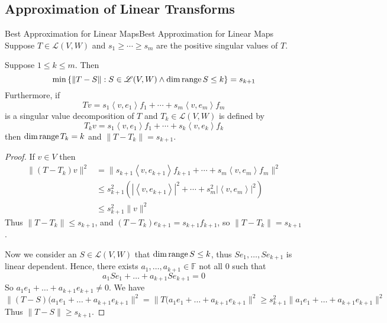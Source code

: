 \documentclass[../main.tex]{subfiles}
\begin{document}
\subsection{Approximation of Linear Transforms}
\begin{theorem}{Best Approximation for Linear Maps}{Best Approximation for Linear Maps}
Suppose $T\in \mathscr{L}(V,W)$ and $s_1 \geq \cdots \geq s_m$ are the positive singular values of $T$.

Suppose $1 \leq k\leq m$. Then
\begin{equation*}
\min \left\{ \|T-S\|: S\in \mathscr{L}(V,W) \land \dim \operatorname{range} S \leq k \right\} = s_{k+1}
\end{equation*}
Furthermore, if
\begin{equation*}
Tv = s_1 \left<v,e_1\right>f_1+ \cdots +s_m \left<v,e_m\right>f_m
\end{equation*}
is a singular value decomposition of $T$ and $T_k\in \mathscr{L}(V,W)$ is defined by
\begin{equation*}
T_k v = s_1 \left<v,e_1\right>f_1 +\cdots +s_k \left<v,e_k\right>f_k
\end{equation*}
then $\dim \operatorname{range} T_k=k$ and $\|T-T_k\|=s_{k+1}$.
\end{theorem}

\begin{proof}
If $v\in V$ then
\begin{equation*}
\begin{aligned}
	\|(T-T_k)v\|^2 &= \|s_{k+1} \left<v,e_{k+1}\right>f_{k+1} +\cdots +s_m \left<v,e_m\right>f_m\|^2\\
	& \leq s_{k+1}^2 \left(\left|\left<v,e_{k+1}\right>\right|^2 +\cdots + s_m^2 \left|\left<v,e_m\right>\right|^2\right)\\
	& \leq s_{k+1}^2 \|v\|^2
\end{aligned}
\end{equation*}
Thus $\|T-T_k\| \leq s_{k+1}$, and $(T-T_k)e_{k+1} = s_{k+1}f_{k+1}$, so $\|T-T_k\| = s_{k+1}$.

Now we consider an $S\in \mathscr{L}(V,W)$ that $\dim \operatorname{range} S \leq k$, thus $Se_1, \ldots ,Se_{k+1}$ is linear dependent. Hence, there exists $a_1, \ldots ,a _{k+1}\in \mathbb{F}$ not all $0$ such that
\begin{equation*}
a_1Se_1+\ldots +a _{k+1}S e_{k+1}=0
\end{equation*}
So $a_1e_1+\ldots +a _{k+1}e_{k+1}\neq 0$. We have
\begin{equation*}
\|(T-S)(a_1e_1+\ldots +a _{k+1}e_{k+1}\|^2 = \|T(a_1e_1+ \ldots + a _{k+1}e_{k+1}\|^2 \geq s_{k+1}^2 \|a_1e_1+\ldots +a _{k+1}e_{k+1}\|^2
\end{equation*}
Thus $\|T-S\| \geq s_{k+1}$.
\end{proof}
\end{document}
